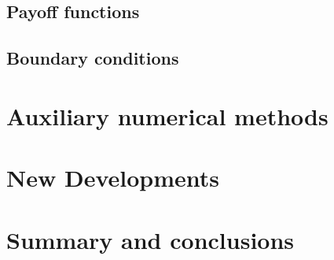 \subsection{Payoff functions}

\subsection{Boundary conditions}

\section{Auxiliary numerical methods}

\section{New Developments}

\section{Summary and conclusions}